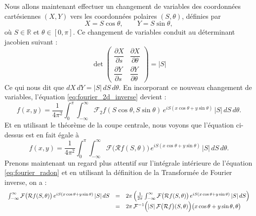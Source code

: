 Nous allons maintenant effectuer un changement de variables des coordonnées
cartésiennes $(X,Y)$ vers les coordonnées polaires $(S,\theta)$, définies par
\begin{equation}
X = S\cos\theta,
\qquad
Y = S\sin\theta,
\end{equation}
où $S \in \mathbb{R}$ et $\theta \in [0,\pi]$.
Ce changement de variables conduit au déterminant jacobien suivant :
\begin{equation}\det
\begin{pmatrix}
    \dfrac{\partial X}{\partial s} & \dfrac{\partial X}{\partial \theta} \\
    \dfrac{\partial Y}{\partial s} & \dfrac{\partial Y}{\partial \theta}
\end{pmatrix}
=|S|
\end{equation}
Ce qui nous dit que $dX\,dY = |S|\,dS\,d\theta$. En incorporant ce nouveau changement de variables, l'équation \eqref{eq:fourier_2d_inverse} devient :
\begin{equation}
f(x,y) = \frac{1}{4\pi^{2}} \int_{0}^{\pi} \int_{-\infty}^{\infty}
\mathcal{F}_{2}f(S\cos\theta, S\sin\theta)\,
e^{iS(x\cos\theta + y\sin\theta)}\,|S|\,dS\,d\theta.
\end{equation}
Et en utilisant le théorème de la coupe centrale, nous voyons que l'équation ci-dessus est en fait égale à
\begin{equation}
    f(x,y) = \frac{1}{4\pi^{2}} \int_{0}^{\pi} \int_{-\infty}^{\infty}
    \mathcal{F}\bigl(\mathcal{R}f(S,\theta)\bigr)\,
    e^{iS(x\cos\theta + y\sin\theta)}\,|S|\,dS\,d\theta.
    \label{eq:fourier_radon}
\end{equation}
Prenons maintenant un regard plus attentif sur l'intégrale intérieure de l'équation \eqref{eq:fourier_radon} et en utilisant la définition de la Transformée de Fourier inverse, on a :
\begin{equation}
    \begin{array}{rcl}
        \int_{-\infty}^{\infty}
        \mathcal{F}\bigl(\mathcal{R}f(S,\theta)\bigr)\,
        e^{iS(x\cos\theta + y\sin\theta)}\,|S|\,dS
        &=&
        2\pi \left(
        \frac{1}{2\pi} \int_{-\infty}^{\infty}
        \mathcal{F}\bigl(\mathcal{R}f(S,\theta)\bigr)\,
        e^{iS(x\cos\theta + y\sin\theta)}\,|S|\,dS
        \right)\\

        &=&
        2\pi\,\mathcal{F}^{-1}
        \Bigl(
        |S|\,\mathcal{F}\bigl(\mathcal{R}f\bigr)(S,\theta)
        \Bigr)
        \bigl(x\cos\theta + y\sin\theta,\theta\bigr)
    \end{array}
    \label{eq:tcc_inverse_fourier}
\end{equation}
